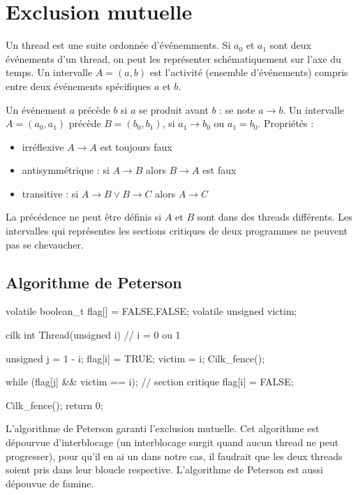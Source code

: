 \documentclass[11pt,a4paper]{report}
\begin{document}
\chapter{Exclusion mutuelle} %
\label{cha:Exclusion mutuelle}
Un thread est une suite ordonnée d'événemments. Si $a_0$ et $a_1$ sont deux événements d'un thread, on peut les représenter schématiquement sur l'axe du temps. Un intervalle $A=(a,b)$ est l'activité (ensemble d'événements) compris entre deux événements spécifiques $a$ et $b$.

Un événement $a$ précède $b$ si $a$ se produit avant $b$ : se note $a \rightarrow b$. Un intervalle $A=(a_0,a_1)$ précède $B=(b_0,b_1)$, si $a_1 \rightarrow b_0$ ou $a_1 = b_0$. Propriétés :
\begin{itemize}
    \item irréflexive $A \rightarrow A$ est toujours faux
    \item antisymmétrique : si $A \rightarrow B$ alors $B \rightarrow A$ est faux
    \item transitive : si $A \rightarrow B \vee B \rightarrow C$ alors $A \rightarrow C$
\end{itemize}

La précédence ne peut être définis si $A$ et $B$ sont dans des threads différents. Les intervalles qui représentes les sections critiques de deux programmes ne peuvent pas se chevaucher.

\section{Algorithme de Peterson} %
\label{sec:Algorithme de Peterson}

\begin{ccode}
volatile boolean_t flag[] = {FALSE,FALSE};
volatile unsigned victim;

cilk int Thread(unsigned i) // i = 0 ou 1
{
    unsigned j = 1 - i;
    flag[i] = TRUE;
    victim = i;
    Cilk_fence();

    while (flag[j] && victim == i);
    // section critique
    flag[i] = FALSE;

    Cilk_fence();
    return 0;
}
\end{ccode}

L'algorithme de Peterson garanti l'exclusion mutuelle. Cet algorithme est dépourvue d'interblocage (un interblocage surgit quand aucun thread ne peut progresser), pour qu'il en ai un dans notre cas, il faudrait que les deux threads soient pris dans leur bloucle respective. L'algorithme de Peterson est aussi dépouvue de famine.
\end{document}

